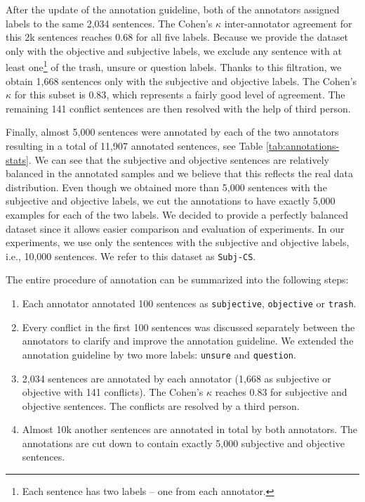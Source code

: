 \documentclass[10pt, a4paper]{article}
\begin{document}
\par After the update of the annotation guideline, both of the annotators assigned labels to the same 2,034 sentences. The Cohen’s $\kappa$ \cite{cohen1960coefficient} inter-annotator agreement for this 2k sentences reaches $0.68$ for all five labels. Because we provide the dataset only with the objective and subjective labels, we exclude any sentence with at least one\footnote{Each sentence has two labels -- one from each annotator.} of the trash, unsure or question labels. Thanks to this filtration, we obtain 1,668 sentences only with the subjective and objective labels. The Cohen’s $\kappa$ for this subset is $0.83$, which represents a fairly good level of agreement. The remaining 141 conflict sentences are then resolved with the help of third person.

\par Finally, almost 5,000 sentences were annotated by each of the two annotators resulting in a total of 11,907 annotated sentences, see Table \ref{tab:annotations-stats}. We can see that the subjective and objective sentences are relatively balanced in the annotated samples and we believe that this reflects the real data distribution. Even though we obtained more than 5,000 sentences with the subjective and objective labels, we cut the annotations to have exactly 5,000 examples for each of the two labels. We decided to provide a perfectly balanced dataset since it allows easier comparison and evaluation of experiments. In our experiments, we use only the sentences with the subjective and objective labels, i.e., 10,000 sentences. We refer to this dataset as \texttt{Subj-CS}.

The entire procedure of annotation can be summarized into the following steps:

\begin{enumerate}
    \item Each annotator annotated 100 sentences as \texttt{subjective}, \texttt{objective} or \texttt{trash}.
    
    \item Every conflict in the first 100 sentences was discussed separately between the annotators to clarify and improve the annotation guideline. We extended the annotation guideline by two more labels: \texttt{unsure} and \texttt{question}.
    
    \item 2,034 sentences are annotated by each annotator (1,668 as subjective or objective with 141 conflicts). The Cohen’s $\kappa$ reaches $0.83$ for subjective and objective sentences. The conflicts are resolved by a third person.
    
    \item Almost 10k another sentences are annotated in total by both annotators. The annotations are cut down to contain exactly 5,000 subjective and objective sentences.
\end{enumerate}
\end{document}

